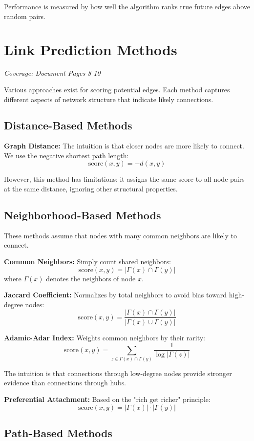 \documentclass[11pt,a4paper]{article}
\begin{document}
Performance is measured by how well the algorithm ranks true future edges above random pairs.

\section{Link Prediction Methods}
\textit{Coverage: Document Pages 8-10}

Various approaches exist for scoring potential edges. Each method captures different aspects of network structure that indicate likely connections.

\subsection{Distance-Based Methods}

\textbf{Graph Distance:} The intuition is that closer nodes are more likely to connect. We use the negative shortest path length:
$$\text{score}(x,y) = -d(x,y)$$

However, this method has limitations: it assigns the same score to all node pairs at the same distance, ignoring other structural properties.

\subsection{Neighborhood-Based Methods}

These methods assume that nodes with many common neighbors are likely to connect.

\textbf{Common Neighbors:} Simply count shared neighbors:
$$\text{score}(x,y) = |\Gamma(x) \cap \Gamma(y)|$$
where $\Gamma(x)$ denotes the neighbors of node $x$.

\textbf{Jaccard Coefficient:} Normalizes by total neighbors to avoid bias toward high-degree nodes:
$$\text{score}(x,y) = \frac{|\Gamma(x) \cap \Gamma(y)|}{|\Gamma(x) \cup \Gamma(y)|}$$

\textbf{Adamic-Adar Index:} Weights common neighbors by their rarity:
$$\text{score}(x,y) = \sum_{z \in \Gamma(x) \cap \Gamma(y)} \frac{1}{\log|\Gamma(z)|}$$

The intuition is that connections through low-degree nodes provide stronger evidence than connections through hubs.

\textbf{Preferential Attachment:} Based on the "rich get richer" principle:
$$\text{score}(x,y) = |\Gamma(x)| \cdot |\Gamma(y)|$$

\subsection{Path-Based Methods}
\end{document}
